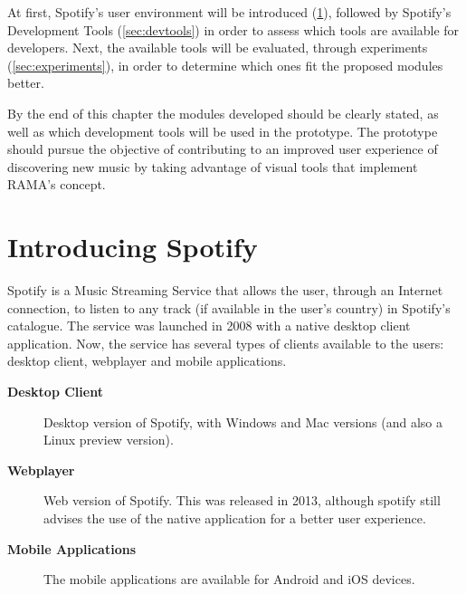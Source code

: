 At first, Spotify's user environment will be introduced (\ref{sec:spotify}), followed by Spotify's Development Tools (\ref{sec:devtools}) in order to assess which tools are available for developers.
Next, the available tools will be evaluated, through experiments (\ref{sec:experiments}), in order to determine which ones fit the proposed modules better.

By the end of this chapter the modules developed should be clearly stated, as well as which development tools will be used in the prototype.
The prototype should pursue the objective of contributing to an improved user experience of discovering new music by taking advantage of visual tools that implement RAMA's concept.

\section{Introducing Spotify} %
\label{sec:spotify}


  Spotify is a Music Streaming Service that allows the user, through an Internet connection, to listen to any track (if available in the user's country) in Spotify's catalogue.
  The service was launched in 2008 with a native desktop client application.
  Now, the service has several types of clients available to the users: desktop client, webplayer and mobile applications.

  \begin{description}
    \item[\textbf{Desktop Client}] Desktop version of Spotify, with Windows and Mac versions (and also a Linux preview version).
    \item[\textbf{Webplayer}] Web version of Spotify. This was released in 2013, although spotify still advises the use of the native application for a better user experience.
    \item[\textbf{Mobile Applications}] The mobile applications are available for Android and iOS devices.
  \end{description}

  


